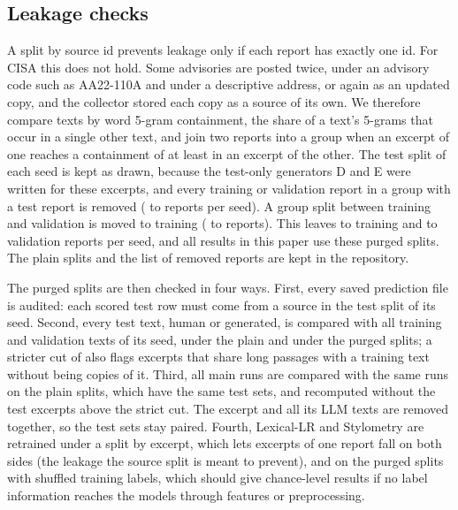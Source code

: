 \documentclass[journal]{IEEEtran}
\begin{document}
\subsection{Leakage checks}\label{sec:leaksetup}
A split by source id prevents leakage only if each report has exactly one id. For CISA this does not hold. Some
advisories are posted twice, under an advisory code such as AA22-110A and under a descriptive address, or again as
an updated copy, and the collector stored each copy as a source of its own. We therefore compare texts by word
5-gram containment, the share of a text's 5-grams that occur in a single other text, and join two reports into a
group when an excerpt of one reaches a containment of at least \LeakDup{} in an excerpt of the other. The test
split of each seed is kept as drawn, because the test-only generators D and E were written for these excerpts, and
every training or validation report in a group with a test report is removed (\LeakRemovedMin{} to
\LeakRemovedMax{} reports per seed). A group split between training and validation is moved to training
(\LeakMovedMin{} to \LeakMovedMax{} reports). This leaves \LeakTrainMin{} to \LeakTrainMax{} training and
\LeakValMin{} to \LeakValMax{} validation reports per seed, and all results in this paper use these purged splits.
The plain splits and the list of removed reports are kept in the repository.

The purged splits are then checked in four ways. First, every saved prediction file is audited: each scored test row
must come from a source in the test split of its seed. Second, every test text, human or generated, is compared with
all training and validation texts of its seed, under the plain and under the purged splits; a stricter cut of
\LeakStrict{} also flags excerpts that share long passages with a training text without being copies of it. Third,
all main runs are compared with the same runs on the plain splits, which have the same test sets, and recomputed
without the test excerpts above the strict cut. The excerpt and all its LLM texts are removed together, so the test
sets stay paired. Fourth, Lexical-LR and Stylometry are retrained under a split by excerpt, which lets excerpts of one
report fall on both sides (the leakage the source split is meant to prevent), and on the purged splits with shuffled
training labels, which should give chance-level results if no label information reaches the models through features
or preprocessing.
\end{document}
